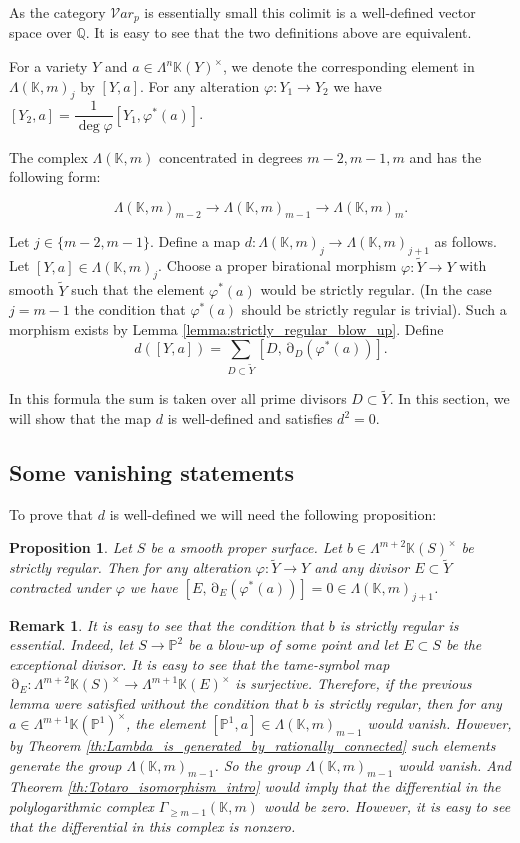 \documentclass[12pt]{extarticle}
\newtheorem{proposition}[theorem]{Proposition}
\newtheorem{remark}[theorem]{Remark}
\def\mb{\mathbb}
\def\mc{\mathcal}
\def\L{\Lambda}
\def\k{\mb K}
\def\Q{\mb Q}
\def\ph{\varphi}
\def\t{\times}
\def\cl{\colon}
\def\wt{\widetilde}
\renewcommand{\P}{{\mb P}}
\newcommand{\EP}[2]{{\Lambda^{#1}\k(#2)^\times}}
\DeclareMathOperator{\ts}{\partial}
\begin{document}
As the category ${\mc Var}_{p}$ is essentially small this colimit is a well-defined vector space over $\Q$. It is easy to see that the two definitions above are equivalent.

For a variety $Y$ and $a\in \EP{n}{Y}$, we denote the corresponding element in $\L(\k, m)_j$ by $[Y, a]$. For any alteration $\ph\cl Y_1\to Y_2$ we have $[Y_2, a]=\dfrac 1{\deg \ph}[Y_1, \ph^*(a)]$.

The complex $\L(\k,m)$ concentrated in degrees $m-2,m-1,m$ and has the following form:

$$\L(\k,m)_{m-2}\to \L(\k,m)_{m-1}\to \L(\k,m)_m.$$

Let $j\in\{m-2,m-1\}$. Define a map $d\colon \L(\k,m)_j\to \L(\k,m)_{j+1}$ as follows. Let $[Y, a]\in \L(\k,m)_j$. Choose a proper birational morphism $\ph \colon \wt Y\to Y$ with smooth $\wt Y$ such that the element $\ph^*(a)$ would be strictly regular. (In the case $j=m-1$ the condition that $\ph^*(a)$ should be strictly regular is trivial). Such a morphism exists by Lemma \ref{lemma:strictly_regular_blow_up}.  Define
$$d([Y, a])=\sum\limits_{D\subset \wt Y}[D, \ts_D(\ph^*(a))].$$

In this formula the sum is taken over all prime divisors $D\subset \wt Y$. In this section, we will show that the map $d$ is well-defined and satisfies $d^2=0$.


\subsection{Some vanishing statements}
\label{sub:sec:vanishing_statements}
To prove that $d$ is well-defined we will need the following proposition:
\begin{proposition}
\label{prop:differential_strictly_regular_elements}
    Let $S$ be a smooth proper surface. Let $b\in \EP{m+2}{S}$ be strictly regular. Then for any alteration $\varphi \colon \wt Y\to Y$ and any divisor $E\subset \wt Y$ contracted under $\varphi$ we have $[E, \ts_E(\ph^*(a))]=0\in \L(\k, m)_{j+1}$. 
\end{proposition}

\begin{remark}
    It is easy to see that the condition that $b$ is strictly regular is essential. Indeed, let $S\to \mb P^2$ be a blow-up of some point and let $E\subset S$ be the exceptional divisor. It is easy to see that the tame-symbol map $\ts_E\colon\Lambda^{m+2}\k(S)^\times\to\Lambda^{m+1}\k(E)^\times$ is surjective. Therefore, if the previous lemma were satisfied without the condition that $b$ is strictly regular, then for any $a\in\L^{m+1}\k(\P^1)^\t$, the element  $[\P^1,a]\in \L(\k,m)_{m-1}$ would vanish. However, by Theorem \ref{th:Lambda_is_generated_by_rationally_connected} such elements generate the group $\L(\k,m)_{m-1}$. So the group $\L(\k,m)_{m-1}$ would vanish. And Theorem \ref{th:Totaro_isomorphism_intro} would imply that the differential in the polylogarithmic complex $\Gamma_{\geq m-1}(\k,m)$ would be zero. However, it is easy to see that the differential in this complex is nonzero.
\end{remark}
\end{document}
